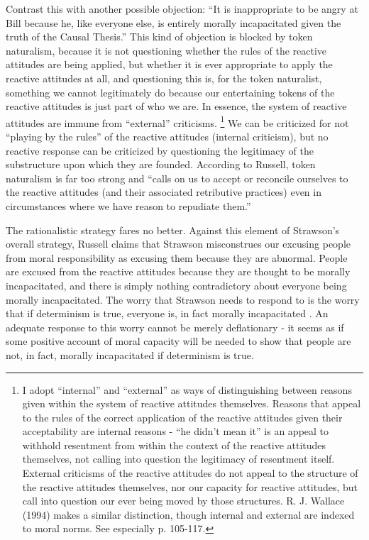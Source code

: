 \documentclass[phd,12pt,oneside,paper=letterpaper]{ubcthesis}
\begin{document}
Contrast this with another possible objection: ``It is inappropriate to be angry at Bill because he, like everyone else, is entirely morally incapacitated given the truth of the Causal Thesis.'' This kind of objection is blocked by token naturalism, because it is not questioning whether the rules of the reactive attitudes are being applied, but whether it is ever appropriate to apply the reactive attitudes at all, and questioning this is, for the token naturalist, something we cannot legitimately do because our entertaining tokens of the reactive attitudes is just part of who we are. In essence, the system of reactive attitudes are immune from ``external'' criticisms. \footnote{I adopt ``internal'' and ``external'' as ways of distinguishing between reasons given within the system of reactive attitudes themselves. Reasons that appeal to the rules of the correct application of the reactive attitudes given their acceptability are internal reasons - ``he didn't mean it'' is an appeal to withhold resentment from within the context of the reactive attitudes themselves, not calling into question the legitimacy of resentment itself. External criticisms of the reactive attitudes do not appeal to the structure of the reactive attitudes themselves, nor our capacity for reactive attitudes, but call into question our ever being moved by those structures. R. J. Wallace (1994) makes a similar distinction, though internal and external are indexed to moral norms.  See especially p. 105-117.} We can be criticized for not ``playing by the rules'' of the reactive attitudes (internal criticism), but no reactive response can be criticized by questioning the legitimacy of the substructure upon which they are founded. According to Russell, token naturalism is far too strong and ``calls on us to accept or reconcile ourselves to the reactive attitudes (and their associated retributive practices) even in circumstances where we have reason to repudiate them.'' \citep[p.297]{russell1992}

The rationalistic strategy fares no better. Against this element of Strawson's overall strategy, Russell claims that Strawson misconstrues our excusing people from moral responsibility as excusing them because they are abnormal. People are excused from the reactive attitudes because they are thought to be morally incapacitated, and there is simply nothing contradictory about everyone being morally incapacitated. The worry that Strawson needs to respond to is the worry that if determinism is true, everyone is, in fact morally incapacitated \citep[p.299]{russell1992}. An adequate response to this worry cannot be merely deflationary - it seems as if some positive account of moral capacity will be needed to show that people are not, in fact, morally incapacitated if determinism is true.
\end{document}
